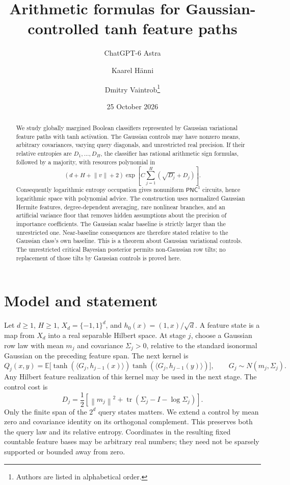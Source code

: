 \documentclass[11pt]{article}
\title{Arithmetic formulas for Gaussian-controlled tanh feature paths}
\author{ChatGPT-6 Astra \and Kaarel H\"anni \and Dmitry Vaintrob\thanks{Authors are listed in alphabetical order.}}
\date{25 October 2026}
\theoremstyle{remark}\newtheorem{remark}[theorem]{Remark}
\newcommand{\E}{\mathbb E}
\newcommand{\PNC}{\mathsf{PNC}}
\newcommand{\norm}[1]{\left\lVert #1\right\rVert}
\begin{document}
\maketitle
\begin{abstract}
We study globally margined Boolean classifiers represented by Gaussian
variational feature paths with tanh activation. The Gaussian controls may
have nonzero means, arbitrary covariances, varying query diagonals, and
unrestricted real precision. If their relative entropies are $D_1,\ldots,D_H$,
the classifier has rational arithmetic sign formulas, followed by a majority,
with resources polynomial in
\[
 (d+H+\norm v+2)\exp\!\left[C\sum_{j=1}^H
                   (\sqrt{D_j}+D_j)\right].
\]
Consequently logarithmic entropy occupation gives nonuniform $\PNC^1$
circuits, hence logarithmic space with polynomial advice. The construction
uses normalized Gaussian Hermite features, degree-dependent averaging,
rare nonlinear branches, and an artificial variance floor that removes
hidden assumptions about the precision of importance coefficients.
The Gaussian scalar baseline is strictly larger than the unrestricted
one. Near-baseline consequences are therefore stated relative to the
Gaussian class's own baseline.
This is a theorem about Gaussian variational controls. The unrestricted
critical Bayesian posterior permits non-Gaussian row tilts; no replacement
of those tilts by Gaussian controls is proved here.
\end{abstract}

\section{Model and statement}

Let $d\ge1$, $H\ge1$, $X_d=\{-1,1\}^d$, and
$h_0(x)=(1,x)/\sqrt d$.
A feature state is a map from $X_d$ into a real separable Hilbert space.
At stage $j$, choose a Gaussian row law with mean $m_j$ and covariance
$\Sigma_j>0$, relative to the standard isonormal Gaussian on the preceding
feature span. The next kernel is
\begin{equation}\label{eq:kernel}
 Q_j(x,y)=\E\bigl[\tanh(\langle G_j,h_{j-1}(x)\rangle)
                       \tanh(\langle G_j,h_{j-1}(y)\rangle)\bigr],
 \qquad G_j\sim N(m_j,\Sigma_j).
\end{equation}
Any Hilbert feature realization of this kernel may be used in the next
stage. The control cost is
\begin{equation}\label{eq:entropy}
 D_j=\frac12\left[\norm{m_j}^2+
            \operatorname{tr}(\Sigma_j-I-\log\Sigma_j)\right].
\end{equation}
Only the finite span of the $2^d$ query states matters. We extend a control
by mean zero and covariance identity on its orthogonal complement.
This preserves both the query law and its relative entropy. Coordinates
in the resulting fixed countable feature bases may be arbitrary real
numbers; they need not be sparsely supported or bounded away from zero.
\end{document}
